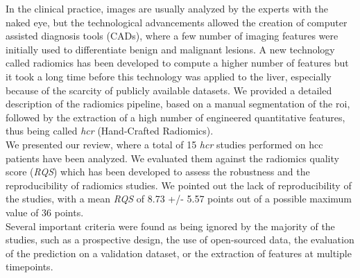 In the clinical practice, images are usually analyzed by the experts
with the naked eye, but the technological advancements allowed the
creation of computer assisted diagnosis tools (CADs), where a few number
of imaging features were initially used to differentiate benign and
malignant lesions.
A new technology called radiomics has been developed to compute a higher
number of features but it took a long time before this technology was
applied to the liver, especially because of the scarcity of publicly
available datasets.
We provided a detailed description of the radiomics pipeline, 
based on a manual segmentation of the \ac{roi}, followed by the extraction of
a high number of engineered quantitative features, thus being called
\emph{\ac{hcr}} (Hand-Crafted Radiomics).\\
We presented our review, where a total of 15 \emph{\ac{hcr}} studies
performed on \ac{hcc} patients have been analyzed.
We evaluated them against the radiomics quality score (\emph{RQS})
which has been developed to assess the robustness and the
reproducibility of radiomics studies.
We pointed out the lack of reproducibility of the studies, with a mean
\emph{RQS} of 8.73 +/- 5.57 points out of a possible maximum value of 36
points.\\
Several important criteria were found as being ignored by the majority
of the studies, such as a prospective design, the use of open-sourced
data, the evaluation of the prediction on a validation dataset, or the
extraction of features at multiple timepoints.

